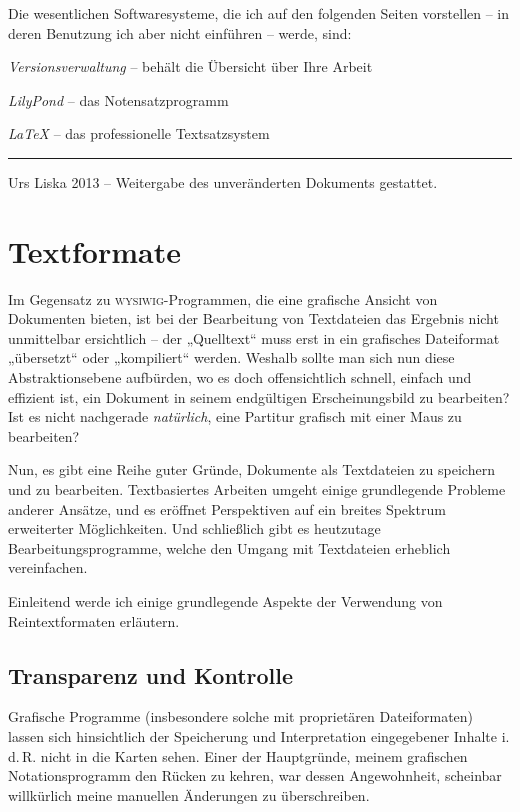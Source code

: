 \documentclass[DIV=12]{scrreprt}
\begin{document}
Die wesentlichen Softwaresysteme, die ich auf den folgenden Seiten vorstellen -- in deren Benutzung ich aber nicht einführen -- werde, sind:

\begin{itemize*}
\item \emph{Versionsverwaltung} -- behält die Übersicht über Ihre Arbeit
\item \emph{LilyPond} -- das Notensatzprogramm
\item \emph{\LaTeX} -- das professionelle Textsatzsystem
\end{itemize*}

\vfill
\hrule
\medskip
\textcopyright{} Urs Liska 2013 -- Weitergabe des unveränderten Dokuments gestattet.

\tableofcontents

\chapter{Textformate}
\label{chap:pt_plain-text-format}
Im Gegensatz zu \textsc{wysiwig}-Programmen, die eine grafische Ansicht von Dokumenten bieten, ist bei der Bearbeitung von Textdateien das Ergebnis nicht unmittelbar ersichtlich -- der „Quelltext“ muss erst in ein grafisches Dateiformat „übersetzt“ oder „kompiliert“ werden.
Weshalb sollte man sich nun diese Abstraktionsebene aufbürden, wo es doch offensichtlich schnell, einfach und effizient ist, ein Dokument in seinem endgültigen Erscheinungsbild zu bearbeiten?
Ist es nicht nachgerade \emph{natürlich}, eine Partitur grafisch mit einer Maus zu bearbeiten?

Nun, es gibt eine Reihe guter Gründe, Dokumente als Textdateien zu speichern und zu bearbeiten.
Textbasiertes Arbeiten umgeht einige grundlegende Probleme anderer Ansätze, und es eröffnet Perspektiven auf ein breites Spektrum erweiterter Möglichkeiten.
Und schließlich gibt es heutzutage Bearbeitungsprogramme, welche den Umgang mit Textdateien erheblich vereinfachen.

Einleitend werde ich einige grundlegende Aspekte der Verwendung von Reintextformaten erläutern.

\section{Transparenz und Kontrolle}
\label{sec:pt_transparency-and-control}
Grafische Programme (insbesondere solche mit proprietären Dateiformaten) lassen sich hinsichtlich der Speicherung und Interpretation eingegebener Inhalte i.\,d.\,R. nicht in die Karten sehen.
Einer der Hauptgründe, meinem grafischen Notationsprogramm den Rücken zu kehren, war dessen Angewohnheit, scheinbar willkürlich meine manuellen Änderungen zu überschreiben.
\end{document}
